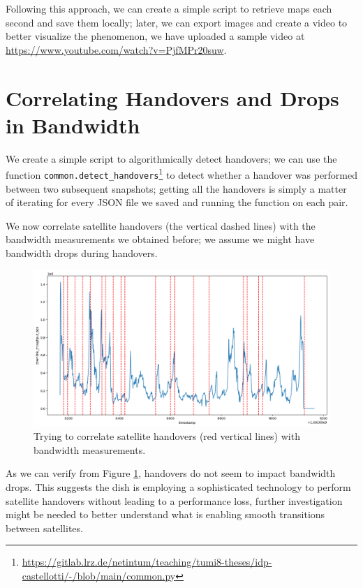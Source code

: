 \documentclass[]{report}
\begin{document}
Following this approach, we can create a simple script to retrieve maps each second and save them locally; later, we can
export images and create a video to better visualize the phenomenon, we have uploaded a sample video at
\url{https://www.youtube.com/watch?v=PjfMPr20suw}.

\section{Correlating Handovers and Drops in Bandwidth}
\label{sec:sat-hand-drop}

We create a simple script to algorithmically detect handovers; we can use the function
\texttt{common.detect\_handovers}\footnote{\url{https://gitlab.lrz.de/netintum/teaching/tumi8-theses/idp-castellotti/-/blob/main/common.py}}
to detect whether a handover was performed between two subsequent snapshots; getting all the handovers is simply a
matter of iterating for every JSON file we saved and running the function on each pair.

We now correlate satellite handovers (the vertical dashed lines) with the bandwidth measurements we obtained before; we
assume we might have bandwidth drops during handovers. 

\begin{figure}
    \centering
    \includegraphics[width=1\columnwidth]{img/correlation_handovers_bw.png}
    \caption{Trying to correlate satellite handovers (red vertical lines) with bandwidth measurements.}
    \label{fig:vis-correlation-handovers}
\end{figure}

As we can verify from Figure \ref{fig:vis-correlation-handovers}, handovers do not seem to impact bandwidth drops. This
suggests the dish is employing a sophisticated technology to perform satellite handovers without leading to a
performance loss, further investigation might be needed to better understand what is enabling smooth transitions between
satellites.
\end{document}
